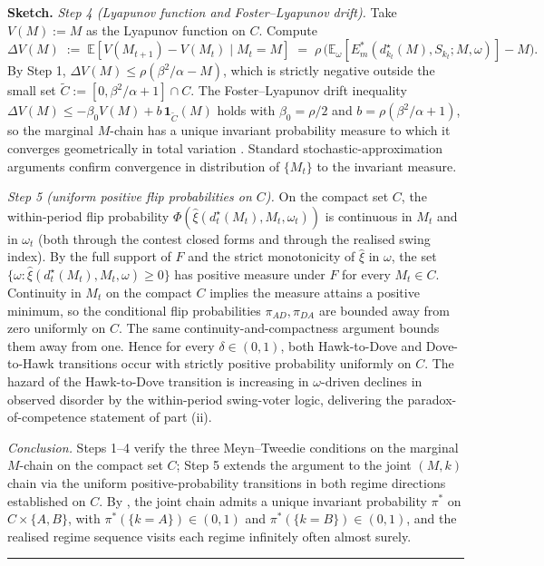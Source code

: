 \documentclass[11pt,twoside]{extarticle}
\newenvironment{proof}[1][Proof]{\noindent \textbf{#1.} }{\ \rule{0.5em}{0.5em}}
\begin{document}
\begin{proof}[Sketch]
\textit{Step 4 (Lyapunov function and Foster–Lyapunov drift).} Take $V(M):=M$ as the Lyapunov function on $C$. Compute
\[
\Delta V(M)\;:=\;\mathbb E[V(M_{t+1})-V(M_t)\mid M_t=M]\;=\;\rho\,\big(\mathbb E_\omega[E_m^*(d_{k_t}^\star(M),S_{k_t};M,\omega)]-M\big).
\]
By Step 1, $\Delta V(M)\le\rho(\beta^2/\alpha-M)$, which is strictly negative outside the small set $\tilde C:=[0,\beta^2/\alpha+1]\cap C$. The Foster–Lyapunov drift inequality $\Delta V(M)\le-\beta_0 V(M)+b\,\mathbf 1_{\tilde C}(M)$ holds with $\beta_0=\rho/2$ and $b=\rho(\beta^2/\alpha+1)$, so the marginal $M$-chain has a unique invariant probability measure to which it converges geometrically in total variation \citep[Ch.~14--15]{meynMarkovChainsStochastic2012}. Standard stochastic-approximation arguments \citep{borkarStochasticApproximation2008} confirm convergence in distribution of $\{M_t\}$ to the invariant measure.

\textit{Step 5 (uniform positive flip probabilities on $C$).} On the compact set $C$, the within-period flip probability $\Phi(\hat\xi(d_t^\star(M_t),M_t,\omega_t))$ is continuous in $M_t$ and in $\omega_t$ (both through the contest closed forms and through the realised swing index). By the full support of $F$ and the strict monotonicity of $\hat\xi$ in $\omega$, the set $\{\omega:\hat\xi(d_t^\star(M_t),M_t,\omega)\ge 0\}$ has positive measure under $F$ for every $M_t\in C$. Continuity in $M_t$ on the compact $C$ implies the measure attains a positive minimum, so the conditional flip probabilities $\pi_{AD},\pi_{DA}$ are bounded away from zero uniformly on $C$. The same continuity-and-compactness argument bounds them away from one. Hence for every $\delta\in(0,1)$, both Hawk-to-Dove and Dove-to-Hawk transitions occur with strictly positive probability uniformly on $C$. The hazard of the Hawk-to-Dove transition is increasing in $\omega$-driven declines in observed disorder by the within-period swing-voter logic, delivering the paradox-of-competence statement of part (ii).

\textit{Conclusion.} Steps 1--4 verify the three Meyn–Tweedie conditions on the marginal $M$-chain on the compact set $C$; Step 5 extends the argument to the joint $(M,k)$ chain via the uniform positive-probability transitions in both regime directions established on $C$. By \citet[Thm.~13.0.1]{meynMarkovChainsStochastic2012}, the joint chain admits a unique invariant probability $\pi^*$ on $C\times\{A,B\}$, with $\pi^*(\{k=A\})\in(0,1)$ and $\pi^*(\{k=B\})\in(0,1)$, and the realised regime sequence visits each regime infinitely often almost surely.
\end{proof}
\end{document}
